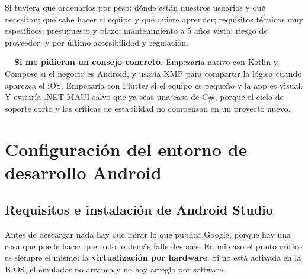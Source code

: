 
Si tuviera que ordenarlos por peso: dónde están nuestros usuarios y qué necesitan; qué sabe hacer el equipo y qué quiere aprender; requisitos técnicos muy específicos; presupuesto y plazo; mantenimiento a 5 años vista; riesgo de proveedor; y por último accesibilidad y regulación.

\begin{ideabox}
\textbf{\color{mint!70!black}\faLightbulb\ \ Si me pidieran un consejo concreto.}
Empezaría nativo con Kotlin y Compose si el negocio es Android, y usaría KMP para compartir la lógica cuando aparezca el iOS. Empezaría con Flutter si el equipo es pequeño y la app es visual. Y evitaría .NET MAUI salvo que ya seas una casa de C\#, porque el ciclo de soporte corto y las críticas de estabilidad no compensan en un proyecto nuevo.
\end{ideabox}\newpage
\section{Configuración del entorno de desarrollo Android}

\subsection{Requisitos e instalación de Android Studio}

Antes de descargar nada hay que mirar lo que publica Google, porque hay una cosa que puede hacer que todo lo demás falle después. En mi caso el punto crítico es siempre el mismo: la \textbf{virtualización por hardware}. Si no está activada en la BIOS, el emulador no arranca y no hay arreglo por software.

